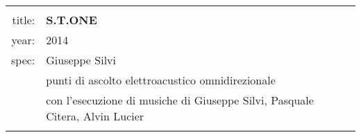 \documentclass[8pt, twoside, a5paper]{extreport}
\begin{document}
\begin{Parallel}[c]{0.47\textwidth}{0.47\textwidth}
\begin{tabular}{r|p{10cm}}
								&			\\
\textsf{title:}					&			\textbf{S.T.ONE}						\\
\textsf{year:}					&			2014								\\
\textsf{spec:}					&			Giuseppe Silvi 				\\
								&			punti di ascolto elettroacustico omnidirezionale\\
								& 			con l’esecuzione di musiche di Giuseppe Silvi, Pasquale Citera, Alvin Lucier\\
								&			\\ %
\hline
\hline

\end{tabular}

\bigskip



	\ParallelPar
	\clearpage

\end{Parallel}
\end{document}

